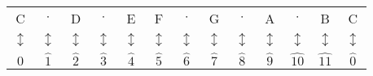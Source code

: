 \documentclass{standalone}
\begin{document}
 \begin{tabular}{ccccccccccccc} 
    C& $\cdot$ & D& $\cdot$ & E& F& $\cdot$ & G& $\cdot$ & A& $\cdot$ & B & C \\
    $\updownarrow $ & $\updownarrow $ & $\updownarrow $ & $\updownarrow $ & $\updownarrow $ & $\updownarrow $ & $\updownarrow $ & $\updownarrow $ & $\updownarrow $ & $\updownarrow $ & $\updownarrow $ & $\updownarrow $ & $\updownarrow$ \\
    $\widehat{0} $ & $\widehat{1} $ & $\widehat{2} $ & $\widehat{3} $ & $\widehat{4} $ & $\widehat{5} $ & $\widehat{6} $ & $\widehat{7} $ & $\widehat{8} $ & $\widehat{9} $ & $\widehat{10} $ & $\widehat{11} $ & $\widehat{0}$\\
  \end{tabular}
\end{document}
